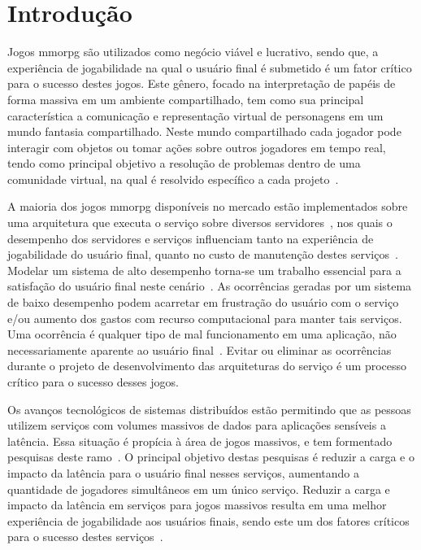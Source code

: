\chapter{Introdução}
\label{introducao}


Jogos \acf{mmorpg} são utilizados como negócio viável e lucrativo, sendo que, a experiência de jogabilidade na qual o usuário final é submetido é um fator crítico para o sucesso destes jogos.
%
Este gênero, focado na interpretação de papéis de forma massiva em um ambiente compartilhado, tem como sua principal característica a comunicação e representação virtual de personagens em um mundo fantasia compartilhado.
%
Neste mundo compartilhado cada jogador pode interagir com objetos ou tomar ações sobre outros jogadores em tempo real, tendo como principal objetivo a resolução de problemas dentro de uma comunidade virtual, na qual é resolvido específico a cada projeto~\cite{video_game_technologies}.



A maioria dos jogos \ac{mmorpg} disponíveis no mercado estão implementados sobre uma arquitetura que executa o serviço sobre diversos servidores~\cite{stephenclarkewillson2017}, nos quais o desempenho dos servidores e serviços influenciam tanto na experiência de jogabilidade do usuário final, quanto no custo de manutenção destes serviços~\cite{1417630}.
%
Modelar um sistema de alto desempenho torna-se um trabalho essencial para a satisfação do usuário final neste cenário~\cite{1417630}.
%
As ocorrências geradas por um sistema de baixo desempenho podem acarretar em frustração do usuário com o serviço e/ou aumento dos gastos com recurso computacional para manter tais serviços.
%
Uma ocorrência é qualquer tipo de mal funcionamento em uma aplicação, não necessariamente aparente ao usuário final~\cite{1417630}.
%
Evitar ou eliminar as ocorrências durante o projeto de desenvolvimento das arquiteturas do serviço é um processo crítico para o sucesso desses jogos.


Os avanços tecnológicos de sistemas distribuídos estão permitindo que as pessoas utilizem serviços com volumes massivos de dados para aplicações sensíveis a latência.
%
Essa situação é propícia à área de jogos massivos, e tem formentado pesquisas deste ramo~\cite{mmo_analytic,1417630,6267019,6063041}.
%
O principal objetivo destas pesquisas é reduzir a carga e o impacto da latência para o usuário final nesses serviços, aumentando a quantidade de jogadores simultâneos em um único serviço.
%
Reduzir a carga e impacto da latência em serviços para jogos massivos resulta em uma melhor experiência de jogabilidade aos usuários finais, sendo este um dos fatores críticos para o sucesso destes serviços~\cite{1417630}.


